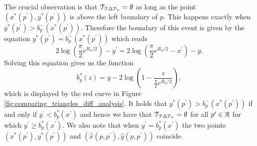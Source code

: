 The crucial observation is that $\mathcal{T}_{{\mathcal P} \Delta {\mathcal P}_n} = \emptyset$ as long as the point $(x^\ast(p^\prime), y^\ast(p^\prime))$ is above the left boundary of $p$. This happens exactly when $y^\ast(p^\prime) > b_p^-(x^\ast(p^\prime))$. Therefore the boundary of this event is given by the equation $y^\ast(p^\prime) = b_p^-(x^\ast(p^\prime))$ which reads
\[
	2\log\left(\frac{\pi}{2}e^{R_n/2}\right) - y^\prime = 2\log\left(\frac{\pi}{2} e^{R_n/2} -x^\prime\right) - y.
\]
Solving this equation gives us the function
\begin{equation}
	b^\ast_p(z) = y - 2\log\left(1 - \frac{z}{\frac{\pi}{2} e^{R_n/2}}\right),
\end{equation}
which is displayed by the red curve in Figure \ref{fig:comparing_triangles_diff_analysis}. It holds that $y^\ast(p^\prime) > b_p^-(x^\ast(p^\prime))$ if and only if $y^\prime < b^\ast_p(x^\prime)$ and hence we have that $\mathcal{T}_{{\mathcal P} \Delta {\mathcal P}_n} = \emptyset$ for all $p^\prime \in {\mathcal R}$ for which $y^\prime \ge b^\ast_p(x^\prime)$. We also note that when $y^\prime = b^\ast_p(x^\prime)$ the two points $(x^\ast(p^\prime), y^\ast(p^\prime))$ and $(\hat{x}(p,p^\prime),\hat{y}(p,p^\prime))$ coincide.



